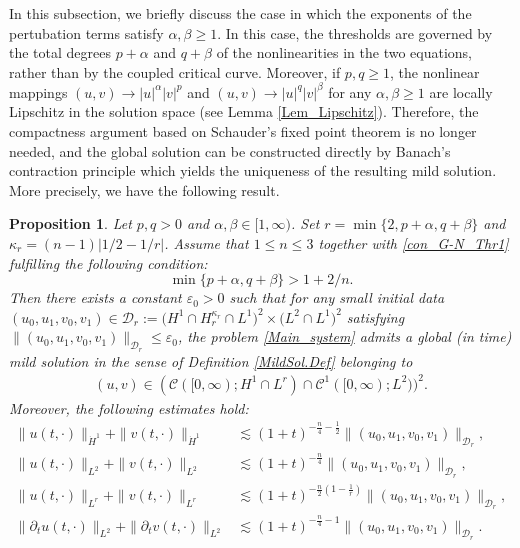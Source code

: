 \documentclass[11pt,reqno]{amsart}
\newtheorem{proposition}{Proposition}[section]
\newcommand{\tron}[1]{\left(#1\right)}
\begin{document}
	In this subsection, we briefly discuss the case in which the exponents of the pertubation terms satisfy $\alpha,\beta\geq 1$. In this case, the thresholds are governed by the total degrees $p+\alpha$ and $q+\beta$ of the nonlinearities in the two equations, rather than by the coupled critical curve. Moreover, if $p,q\geq 1$, the nonlinear mappings $(u,v)\to |u|^{\alpha}|v|^{p}$ and $(u,v)\to |u|^{q}|v|^{\beta}$ for any $\alpha,\beta\geq 1$ are locally Lipschitz in the solution space (see Lemma \ref{Lem_Lipschitz}). Therefore, the compactness argument based on Schauder's fixed point theorem is no longer needed, and the global solution can be constructed directly by Banach's contraction principle which yields the uniqueness of the resulting mild solution. More precisely, we have the following result.
	\begin{proposition}\label{Thr_2_Globalexistence}
		Let $p,q>0$ and $\alpha,\beta\in[1,\infty)$. Set $r=\min\{2,p+\alpha,q+\beta\}$ and $\kappa_{r}=(n-1)|1/2-1/r|$. Assume that $1\leq n\leq3$ together with \eqref{con_G-N_Thr1} fulfilling the following condition:
		\begin{equation}\label{Thr2globalexistence_Critical_exponent}
			\min\{p+\alpha,q+\beta\}>1+2/n.
		\end{equation}
		Then there exists a constant $\varepsilon_0>0$ such that for any small initial data $(u_0,u_1,v_0,v_1)\in \mathcal{D}_r:=\bigl(H^1\cap H^{\kappa_r}_r\cap L^1\bigr)^2\times\bigl(L^2\cap L^1\bigr)^2$ satisfying $\|(u_0,u_1,v_0,v_1)\|_{\mathcal{D}_r}\leq\varepsilon_0$, the problem \eqref{Main_system} admits a global (in time) mild solution in the sense of Definition \ref{MildSol.Def} belonging to
		\begin{align*}
			(u,v)\in (\mathcal{C}([0,\infty); H^1\cap L^r)\cap \mathcal{C}^1([0,\infty);L^2))^2.
		\end{align*}
		Moreover, the following estimates hold:
		\begin{align*}
			\|u(t,\cdot)\|_{\dot{H}^1}+\|v(t,\cdot)\|_{\dot{H}^1}&\lesssim (1+t)^{-\frac{n}{4}-\frac{1}{2}} \|(u_0,u_1,v_0,v_1)\|_{\mathcal{D}_r},\\
			\|u(t,\cdot)\|_{L^{2}}+\|v(t,\cdot)\|_{L^2}&\lesssim (1+t)^{-\frac{n}{4}}\|(u_0,u_1,v_0,v_1)\|_{\mathcal{D}_r},\\
			\|u(t,\cdot)\|_{L^{r}}+\|v(t,\cdot)\|_{L^r}&\lesssim (1+t)^{-\frac{n}{2}\tron{1-\frac{1}{r}}}\|(u_0,u_1,v_0,v_1)\|_{\mathcal{D}_r},\\
			\|\partial_tu(t,\cdot)\|_{L^2}+\|\partial_tv(t,\cdot)\|_{L^2}&\lesssim (1+t)^{-\frac{n}{4}-1}\|(u_0,u_1,v_0,v_1)\|_{\mathcal{D}_r}.
		\end{align*}
	\end{proposition}
	
\end{document}
